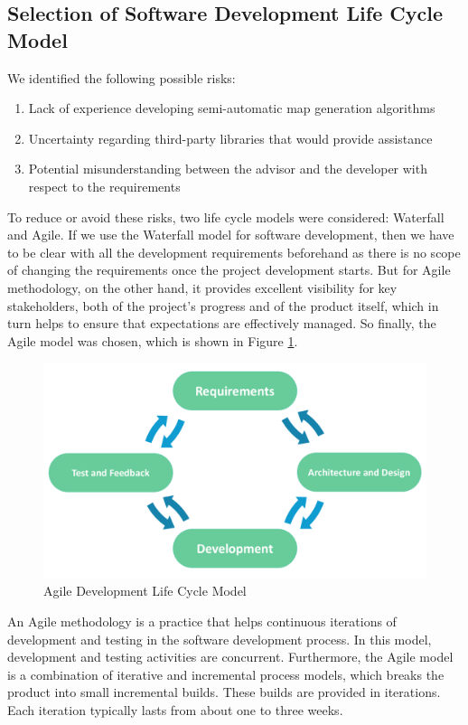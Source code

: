 \subsection{Selection of Software Development Life Cycle Model}
\label{sec:Requirements>SDLC}
We identified the following possible risks:
\begin{enumerate}
  \item Lack of experience developing semi-automatic map generation algorithms
  \item Uncertainty regarding third-party libraries that would provide assistance
  \item Potential misunderstanding between the advisor and the developer with respect to the requirements
\end{enumerate}

To reduce or avoid these risks, two life cycle models were considered: Waterfall and Agile. If we use the Waterfall model for software development, then we have to be clear with all the development requirements beforehand as there is no scope of changing the requirements once the project development starts. But for Agile methodology, on the other hand, it provides excellent visibility for key stakeholders, both of the project’s progress and of the product itself, which in turn helps to ensure that expectations are effectively managed. So finally, the Agile model was chosen, which is shown in Figure \ref{fig:Agile Model}.

\begin{figure}[htb]
\centering
\includegraphics[width=\textwidth]{section02/assets/Agile.png}
\caption[Agile Development Life Cycle Model]{\label{fig:Agile Model}Agile Development Life Cycle Model \cite{web:AgileModel}}
\end{figure}

An Agile methodology is a practice that helps continuous iterations of development and testing in the software development process. In this model, development and testing activities are concurrent. Furthermore, the Agile model is a combination of iterative and incremental process models, which breaks the product into small incremental builds. These builds are provided in iterations. Each iteration typically lasts from about one to three weeks.

